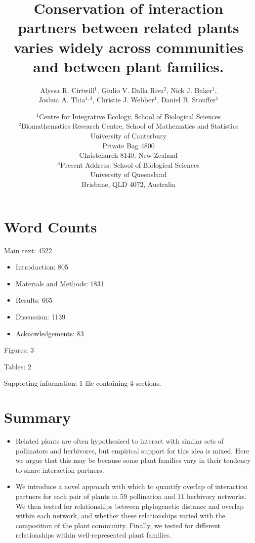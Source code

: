 \documentclass[12pt]{article}
\title{Conservation of interaction partners between related plants varies widely across communities and between plant families.}
\author{Alyssa R. Cirtwill$^{1}$, Giulio V. Dalla Riva$^{2}$, Nick J. Baker$^{1}$,\\
 Joshua A. Thia$^{1,3}$, Christie J. Webber$^{1}$, Daniel B. Stouffer$^{1}$}
\date{\small$^1$Centre for Integrative Ecology, School of Biological Sciences\\
    \medskip$^2$Biomathematics Research Centre, School of Mathematics and Statistics\\
            University of Canterbury\\Private Bag 4800\\
Christchurch 8140, New Zealand\\
\medskip$^3$Present Address: School of Biological Sciences\\
University of Queensland\\Brisbane, QLD 4072, Australia }
\begin{document}
\maketitle
\baselineskip=8.5mm
\begin{spacing}{1.0}

\section*{Word Counts}

Main text: 4522

\begin{itemize}
  \item Introduction: 805 
  \item Materials and Methods: 1831 
  \item Results: 665
  \item Discussion: 1139 
  \item Acknowledgements: 83
\end{itemize}



Figures: 3


Tables: 2


Supporting information: 1 file containing 4 sections.


\vspace{0.4 in}

\section*{Summary}

  \begin{itemize}
    \item Related plants are often hypothesised to interact with similar sets of 
          pollinators and herbivores, but empirical support for this idea is mixed.
          Here we argue that this may be because some plant families vary in their 
          tendency to share interaction partners.

    \item We introduce a novel approach with which to quantify
          overlap of interaction
          partners for each pair of plants in 59 pollination and 11 herbivory
          networks.  We then tested for relationships between phylogenetic 
          distance and overlap within each network, and whether these 
          relationships varied with the composition of the plant community.
          Finally, we tested for different relationships within well-represented
          plant families.


\end{itemize}
\end{spacing}
\end{document}
